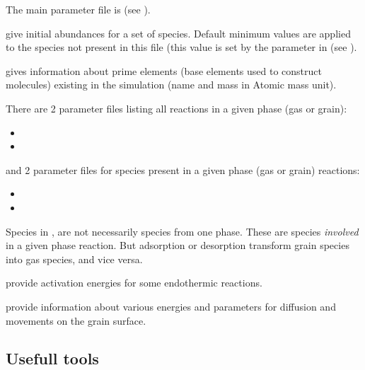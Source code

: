 \documentclass[english,a4paper,twoside]{article}
\begin{document}
The main parameter file is  (see ).

 give initial abundances for a set of species. Default minimum values are applied to the species not present in this file (this value is set by the parameter  in  (see ).

 gives information about prime elements (base elements used to construct molecules) existing in the simulation (name and mass in Atomic mass unit).

There are 2 parameter files listing all reactions in a given phase (gas or grain): 
\begin{itemize}
\item {}
\item {}
\end{itemize}
and 2 parameter files for species present in a given phase (gas or grain) reactions:
\begin{itemize}
\item {}
\item {}
\end{itemize}

\begin{remarque}
Species in ,  are not necessarily species from one phase. These are species \emph{involved} in a given phase reaction. But adsorption or desorption transform grain species into gas species, and vice versa. 
\end{remarque}

 provide activation energies for some endothermic reactions. 

 provide information about various energies and parameters for diffusion and movements on the grain surface.

\subsection{Usefull tools}
\end{document}
